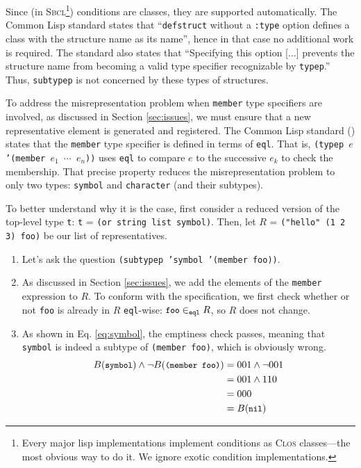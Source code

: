 \documentclass[format=sigconf]{acmart}
\newcommand\code[2][\small]{\sloppy\texttt{#1#2}}
\newcommand\mcode[2][\small]{\text{\code[#1]{#2}}}
\theoremstyle{definition}
\newcommand\sbcl{\textsc{Sbcl}}
\begin{document}
Since (in \sbcl\footnote{Every major lisp implementations implement conditions
  as \textsc{Clos} classes---the most obvious way to do it. We ignore exotic
  condition implementations.}) conditions are classes, they are supported
automatically.
The Common Lisp standard \cite{bib:ansi.94.cl} states that ``\code{defstruct}
without a \code{:type} option defines a class with the structure name as its
name'', hence in that case no additional work is required. The standard also
states that ``Specifying this option [...] prevents the structure name from
becoming a valid type specifier recognizable by \code{typep}.'' Thus,
\code{subtypep} is not concerned by these types of structures.

To address the misrepresentation problem when \code{member} type specifiers are
involved, as discussed in Section \ref{sec:issues}, we must ensure that a new
representative element is generated and registered. The Common Lisp
standard (\cite{bib:ansi.94.cl}) states that the \code{member} type specifier is
defined in terms of \code{eql}. That is, \code{(typep $e$ '(member $e_1$
  $\cdots$ $e_n$))} uses \code{eql} to compare $e$ to the successive $e_k$ to
check the membership. That precise property reduces the misrepresentation
problem to only two types: \code{symbol} and \code{character} (and their
subtypes).

To better understand why it is the case, first consider a reduced version of the
top-level type \code{t}: \code{t} = \code{(or string list symbol)}. Then, let
$R$ = \code{("hello" (1 2 3) foo)} be our list of representatives.
\begin{enumerate}
\item Let's ask the question \code{(subtypep 'symbol '(member foo))}.
\item As discussed in Section \ref{sec:issues}, we add the elements of the
  \code{member} expression to $R$. To conform with the specification, we first
  check whether or not \code{foo} is already in $R$ \code{eql}-wise:
  $\mcode{foo} \in_{\mcode[\scriptsize]{eql}} R$, so $R$ does not change.
\item As shown in Eq. \ref{eq:symbol}, the emptiness check passes, meaning that
  \code{symbol} is indeed a subtype of \code{(member foo)}, which is obviously
  wrong.
  \begin{align}
    B(\mcode{symbol}) \wedge \neg B(\mcode{(member foo)}) &= 001 \wedge \neg 001 \label{eq:symbol}\\
                                                          &= 001 \wedge 110 \nonumber\\
                                                          &= 000 \nonumber\\
                                                          &= B(\mcode{nil}) \nonumber
  \end{align}
\end{enumerate}
\end{document}
